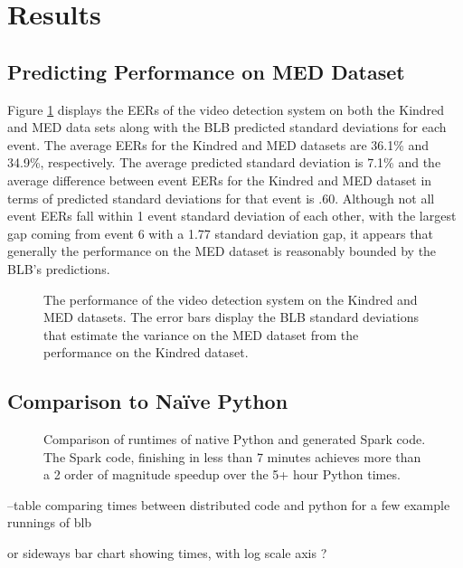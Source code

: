 
\section{Results}

\subsection{Predicting Performance on MED Dataset}

Figure \ref{fig:blb} displays the EERs of the video detection system on both the Kindred and MED data sets along with the BLB predicted standard deviations for each event. The average EERs for the Kindred and MED datasets are 36.1\% and 34.9\%, respectively. The average predicted standard deviation is 7.1\% and the average difference between event EERs for the Kindred and MED dataset in terms of predicted standard deviations for that event is .60. Although not all event EERs fall within 1 event standard deviation of each other, with the largest gap coming from event 6 with a 1.77 standard deviation gap, it appears that generally the performance on the MED dataset is reasonably bounded by the BLB's predictions. 

\begin{figure}[ht]
\centering
{}
{}
%
\caption{The performance of the video detection system on the Kindred and MED datasets. 
 The error bars display the BLB standard deviations that estimate the variance on the MED dataset from the performance on the Kindred dataset.}
\label{fig:blb}
\end{figure}


\subsection{Comparison to Na\"ive Python}


\begin{figure}
\centering
{}
\caption{Comparison of runtimes of native Python and generated Spark code. The Spark code, finishing in less than 7 minutes achieves more than a 2 order of magnitude speedup over the 5+ hour Python times. }
\label{fig:python}

\end{figure}
 

--table comparing times between distributed code and python for a few example runnings of blb  

or sideways bar chart showing times, with log scale axis  ?
